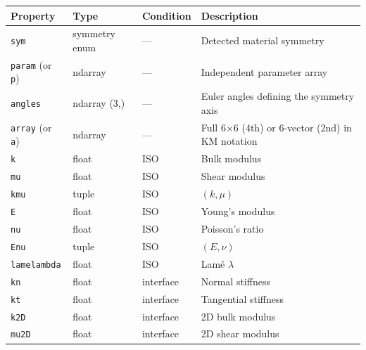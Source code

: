 \documentclass[
  a4paper,
  numbers=noendperiod,
  DIV=12]{scrreprt}
\newcounter{none} %
\begin{document}
{\def\LTcaptype{none} %
\begin{longtable}[]{@{}
  >{\raggedright\arraybackslash}p{}
  >{\raggedright\arraybackslash}p{}
  >{\raggedright\arraybackslash}p{}
  >{\raggedright\arraybackslash}p{}@{}}
\toprule\noalign{}
\begin{minipage}[b]{\linewidth}\raggedright
Property
\end{minipage} & \begin{minipage}[b]{\linewidth}\raggedright
Type
\end{minipage} & \begin{minipage}[b]{\linewidth}\raggedright
Condition
\end{minipage} & \begin{minipage}[b]{\linewidth}\raggedright
Description
\end{minipage} \\
\midrule\noalign{}
\endhead
\bottomrule\noalign{}
\endlastfoot
\texttt{sym} & symmetry enum & --- & Detected material symmetry \\
\texttt{param} (or \texttt{p}) & ndarray & --- & Independent parameter
array \\
\texttt{angles} & ndarray (3,) & --- & Euler angles defining the
symmetry axis \\
\texttt{array} (or \texttt{a}) & ndarray & --- & Full 6×6 (4th) or
6-vector (2nd) in KM notation \\
\texttt{k} & float & ISO & Bulk modulus \\
\texttt{mu} & float & ISO & Shear modulus \\
\texttt{kmu} & tuple & ISO & \((k, \mu)\) \\
\texttt{E} & float & ISO & Young's modulus \\
\texttt{nu} & float & ISO & Poisson's ratio \\
\texttt{Enu} & tuple & ISO & \((E, \nu)\) \\
\texttt{lamelambda} & float & ISO & Lamé \(\lambda\) \\
\texttt{kn} & float & interface & Normal stiffness \\
\texttt{kt} & float & interface & Tangential stiffness \\
\texttt{k2D} & float & interface & 2D bulk modulus \\
\texttt{mu2D} & float & interface & 2D shear modulus \\
\end{longtable}
}
\end{document}
